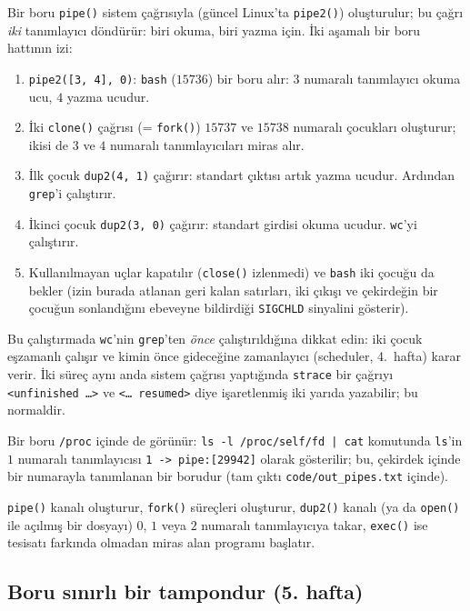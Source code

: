 \documentclass[11pt,a4paper]{article}
\newcommand{\cmd}[1]{\texttt{#1}}
\begin{document}
Bir boru \cmd{pipe()} sistem çağrısıyla (güncel Linux'ta \cmd{pipe2()}) oluşturulur; bu çağrı \emph{iki} tanımlayıcı döndürür: biri okuma, biri yazma için. İki aşamalı bir boru hattının izi:



\begin{enumerate}[leftmargin=1.4em]
  \item \cmd{pipe2([3, 4], 0)}: \cmd{bash} ($15736$) bir boru alır: $3$ numaralı tanımlayıcı okuma ucu, $4$ yazma ucudur.
  \item İki \cmd{clone()} çağrısı (= \cmd{fork()}) $15737$ ve $15738$ numaralı çocukları oluşturur; ikisi de $3$ ve $4$ numaralı tanımlayıcıları miras alır.
  \item İlk çocuk \cmd{dup2(4, 1)} çağırır: standart çıktısı artık yazma ucudur. Ardından \cmd{grep}'i çalıştırır.
  \item İkinci çocuk \cmd{dup2(3, 0)} çağırır: standart girdisi okuma ucudur. \cmd{wc}'yi çalıştırır.
  \item Kullanılmayan uçlar kapatılır (\cmd{close()} izlenmedi) ve \cmd{bash} iki çocuğu da bekler (izin burada atlanan geri kalan satırları, iki çıkışı ve çekirdeğin bir çocuğun sonlandığını ebeveyne bildirdiği \texttt{SIGCHLD} sinyalini gösterir).
\end{enumerate}
Bu çalıştırmada \cmd{wc}'nin \cmd{grep}'ten \emph{önce} çalıştırıldığına dikkat edin: iki çocuk eşzamanlı çalışır ve kimin önce gideceğine zamanlayıcı (scheduler, 4.~hafta) karar verir. İki süreç aynı anda sistem çağrısı yaptığında \cmd{strace} bir çağrıyı \texttt{<unfinished \dots>} ve \texttt{<\dots{} resumed>} diye işaretlenmiş iki yarıda yazabilir; bu normaldir.

Bir boru \texttt{/proc} içinde de görünür: \cmd{ls -l /proc/self/fd | cat} komutunda \cmd{ls}'in $1$ numaralı tanımlayıcısı \texttt{1 -> pipe:[29942]} olarak gösterilir; bu, çekirdek içinde bir numarayla tanımlanan bir borudur (tam çıktı \texttt{code/out\_pipes.txt} içinde).

\begin{keyidea}
\cmd{pipe()} kanalı oluşturur, \cmd{fork()} süreçleri oluşturur, \cmd{dup2()} kanalı (ya da \cmd{open()} ile açılmış bir dosyayı) $0$, $1$ veya $2$ numaralı tanımlayıcıya takar, \cmd{exec()} ise tesisatı farkında olmadan miras alan programı başlatır.
\end{keyidea}

\subsection{Boru sınırlı bir tampondur (5. hafta)}
\end{document}
